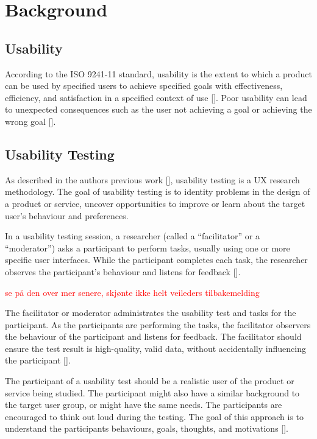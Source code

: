 \section{Background}

\subsection{Usability}
According to the ISO 9241-11 standard, usability is the extent to which a product can be used by specified users to achieve specified goals with effectiveness, efficiency, and satisfaction in a specified context of use [\cite{iso_2022}]. Poor usability can lead to unexpected consequences such as the user not achieving a goal or achieving the wrong goal [\cite{iso_2022}].

\subsection{Usability Testing}
As described in the authors previous work [\cite{ano_2021}], usability testing is a UX research methodology. The goal of usability testing is to identity problems in the design of a product or service, uncover opportunities to improve or learn about the target user’s behaviour and preferences.

In a usability testing session, a researcher (called a “facilitator” or a “moderator”) asks a participant to perform tasks, usually using one or more specific user interfaces. While the participant completes each task, the researcher observes the participant’s behaviour and listens for feedback [\cite{ano_2021}].

\textcolor{red}{se på den over mer senere, skjønte ikke helt veileders tilbakemelding}

The facilitator or moderator administrates the usability test and tasks for the participant. As the participants are performing the tasks, the facilitator observers the behaviour of the participant and listens for feedback. The facilitator should ensure the test result is high-quality, valid data, without accidentally influencing the participant [\cite{ano_2021}].

The participant of a usability test should be a realistic user of the product or service being studied. The participant might also have a similar background to the target user group, or might have the same needs. The participants are encouraged to think out loud during the testing. The goal of this approach is to understand the participants behaviours, goals, thoughts, and motivations [\cite{ano_2021}].

